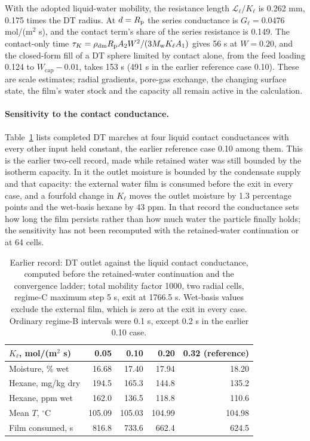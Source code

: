 With the adopted liquid-water mobility, the resistance length
$\mathcal L_\ell/K_\ell$ is 0.262 mm, 0.175 times the DT radius. At
$d=R_{\mathrm{p}}$ the series conductance is $G_\ell=0.0476$ mol/(m$^2$ s), and the
contact term's share of the series resistance is 0.149. The contact-only time
$\tau_K=\rho_{\mathrm{dm}}R_{\mathrm{p}} A_2W^2/(3M_{\mathrm w}K_\ell A_1)$ gives
56 s at $W=0.20$, and the closed-form fill of a DT sphere limited by contact alone,
from the feed loading 0.124 to $W_{\mathrm{cap}}-0.01$, takes 153 s
(491 s in the earlier reference case 0.10). These are scale estimates;
radial gradients, pore-gas exchange, the changing surface state, the
film's water stock and the capacity all remain active in the calculation.

\paragraph{Sensitivity to the contact conductance.}
\label{sup:contactsensitivity}
Table~\ref{tab:finitecontact:sensitivity} lists completed DT marches at
four liquid contact conductances with every other input held constant,
the earlier reference case 0.10 among them. This is the earlier
two-cell record, made while retained water was still bounded by the
isotherm capacity. In it the outlet moisture is bounded by the condensate
supply and that capacity: the external water film is consumed before
the exit in every case, and a fourfold change in $K_\ell$ moves the outlet
moisture by 1.3 percentage points and the wet-basis hexane by 43 ppm.
In that record the conductance sets how long the film persists rather
than how much water the particle finally holds; the sensitivity has not
been recomputed with the retained-water continuation or at 64 cells.

\begin{table}[htbp]\centering\small
\caption{Earlier record: DT outlet against the liquid contact conductance,
computed before the retained-water continuation and the convergence
ladder; total mobility factor 1000, two radial cells, regime-C maximum step 5 s, exit at
1766.5 s. Wet-basis values exclude the external film, which is zero at
the exit in every case. Ordinary regime-B intervals were 0.1 s, except
0.2 s in the earlier 0.10 case.}
\label{tab:finitecontact:sensitivity}
\begin{tabular}{@{}lrrrr@{}}\toprule
$K_\ell$, mol/(m$^2$ s) & 0.05 & 0.10 & 0.20 & 0.32 (reference)\\\midrule
Moisture, \% wet & 16.68 & 17.40 & 17.94 & 18.20\\
Hexane, mg/kg dry & 194.5 & 165.3 & 144.8 & 135.2\\
Hexane, ppm wet & 162.0 & 136.5 & 118.8 & 110.6\\
Mean $T$, $^\circ$C & 105.09 & 105.03 & 104.99 & 104.98\\
Film consumed, s & 816.8 & 733.6 & 662.4 & 624.5\\
\bottomrule\end{tabular}\end{table}

